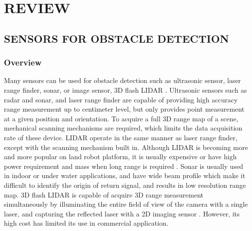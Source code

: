 \chapter{REVIEW}\label{ch:Review}

\section{SENSORS FOR OBSTACLE DETECTION}\label{sec:sensor}

\subsection{Overview}\label{sec:SensorOverview}

Many sensors can be used for obstacle detection such as ultrasonic
sensor, laser range finder, sonar, or image sensor, 3D flash LIDAR
\cite{de_angelis_low-cost_2007} \cite{alonge_novel_2009}
\cite{harb_neural_2008} \cite{saad_robust_2011}
\cite{williams_efficient_2001} \cite{chong_feature-based_1999}
\cite{hanna_obstacle_2008} \cite{lu_distance_2010}
\cite{civera_inverse_2008} \cite{jirawimut_visual_2003}
\cite{amzajerdian_lidar_2011}. Ultrasonic sensors such as radar and
sonar, and laser range finder are capable of providing high accuracy
range measurement up to centimeter level, but only provides point
measurement at a given position and orientation. To acquire a full 3D
range map of a scene, mechanical scanning mechanisms are required,
which limits the data acquisition rate of these device. LIDAR operate
in the same manner as laser range finder, except with the scanning
mechanism built in. Although LIDAR is becoming more and more popular
on land robot platform, it is usually expensive
\cite{subharsanan_low_2013} or have high power requirement and mass
when long range is required \cite{lemmens_airborne_2007}. Sonar is
usually used in indoor or under water applications, and have wide beam
profile which make it difficult to identify the origin of return
signal, and results in low resolution range map. 3D flash LIDAR is
capable of acquire 3D range measurement simultaneously by illuminating
the entire field of view of the camera with a single laser, and
capturing the reflected laser with a 2D imaging sensor
\cite{amzajerdian_lidar_2011}. However, its high cost has limited its use in commercial
application.

